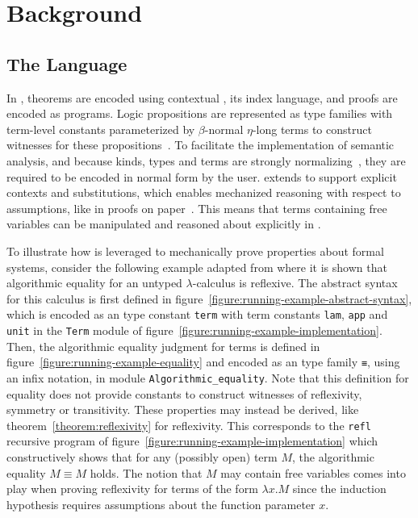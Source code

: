 \chapter{Background}

\section{The \Beluga Language}

In \Beluga, theorems are encoded using contextual \LF, its index language, and proofs are encoded as programs.
Logic propositions are represented as \LF type families with term-level constants parameterized by $\beta$-normal $\eta$-long \LF terms to construct witnesses for these propositions~\cite{nanevski2008contextual, foundation2008pientka, DBLP:journals/corr/abs-1009-2789}.
To facilitate the implementation of semantic analysis, and because \LF kinds, types and terms are strongly normalizing~\cite{harper1993framework}, they are required to be encoded in normal form by the user.
\Beluga extends \LF to support explicit contexts and substitutions, which enables mechanized reasoning with respect to assumptions, like in proofs on paper~\cite{pientka2010programming}.
This means that terms containing free variables can be manipulated and reasoned about explicitly in \Beluga.

To illustrate how \Beluga is leveraged to mechanically prove properties about formal systems, consider the following example adapted from \cite{felty2010reasoning} where it is shown that algorithmic equality for an untyped $\lambda$-calculus is reflexive.
The abstract syntax for this calculus is first defined in figure~\ref{figure:running-example-abstract-syntax}, which is encoded as an \LF type constant \verb|term| with term constants \verb|lam|, \verb|app| and \verb|unit| in the \verb|Term| module of figure~\ref{figure:running-example-implementation}.
Then, the algorithmic equality judgment for terms is defined in figure~\ref{figure:running-example-equality} and encoded as an \LF type family \verb|≡|, using an infix notation, in module \verb|Algorithmic_equality|.
Note that this definition for equality does not provide constants to construct witnesses of reflexivity, symmetry or transitivity.
These properties may instead be derived, like theorem~\ref{theorem:reflexivity} for reflexivity.
This corresponds to the \verb|refl| recursive program of figure~\ref{figure:running-example-implementation} which constructively shows that for any (possibly open) term $M$, the algorithmic equality $M \equiv M$ holds.
The notion that $M$ may contain free variables comes into play when proving reflexivity for terms of the form $\lambda x. M$ since the induction hypothesis requires assumptions about the function parameter $x$.

